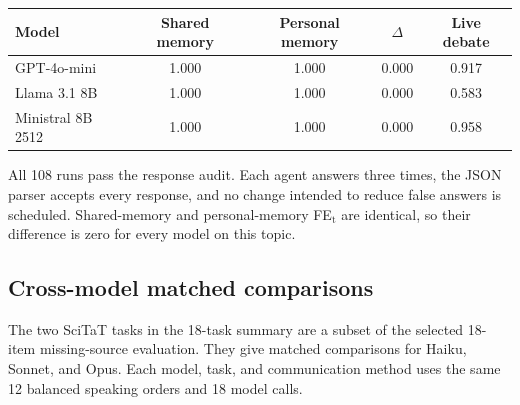 \begin{fixedtable}
\caption{Matched ego-depletion results with the same instruction for both neutral agents for GPT-4o-mini, Llama 3.1 8B, and Ministral 8B 2512. Each entry is mean FE$_\text{t}$ over 12 balanced speaking orders and 18 model calls per run. $\Delta$ is shared memory FE$_\text{t}$ minus personal memory FE$_\text{t}$.}
\label{tab:neutral_open_ego}
\begin{center}
\small
\begin{tabular}{lcccc}
\toprule
Model & Shared memory & Personal memory & $\Delta$ & Live debate \\
\midrule
GPT-4o-mini & 1.000 & 1.000 & 0.000 & 0.917 \\
Llama 3.1 8B & 1.000 & 1.000 & 0.000 & 0.583 \\
Ministral 8B 2512 & 1.000 & 1.000 & 0.000 & 0.958 \\
\bottomrule
\end{tabular}
\end{center}
\end{fixedtable}

All 108 runs pass the response audit. Each agent answers three times, the JSON parser accepts every response, and no change intended to reduce false answers is scheduled. Shared-memory and personal-memory FE$_\text{t}$ are identical, so their difference is zero for every model on this topic.

\subsection{Cross-model matched comparisons}

The two SciTaT tasks in the 18-task summary are a subset of the selected 18-item missing-source evaluation. They give matched comparisons for Haiku, Sonnet, and Opus. Each model, task, and communication method uses the same 12 balanced speaking orders and 18 model calls.

